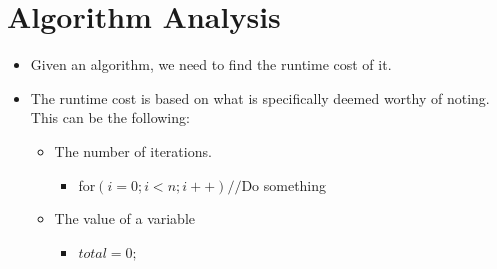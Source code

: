 \documentclass{article}
\begin{document}
\section{Algorithm Analysis}
\begin{itemize}
    \item Given an algorithm, we need to find the runtime cost of it.
    \item The runtime cost is based on what is specifically deemed worthy of noting. This can be the following:
	    \begin{itemize}
            \item The number of iterations.
                \begin{itemize}
                    \item for$(i = 0; i < n; i++) // $Do something
                \end{itemize}
            \item The value of a variable
                \begin{itemize}
                    \item 
                    $total = 0;$
                    

\end{itemize}
\end{itemize}
\end{itemize}
\end{document}
